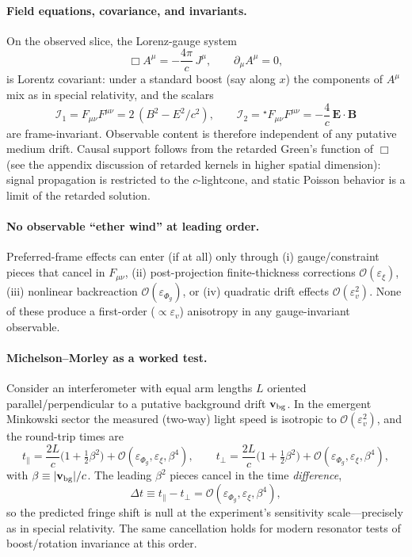 \paragraph{Field equations, covariance, and invariants.}
On the observed slice, the Lorenz-gauge system
\begin{equation}
\Box A^\mu = -\frac{4\pi}{c}\,J^\mu,\qquad \partial_\mu A^\mu=0,
\end{equation}
is Lorentz covariant: under a standard boost (say along $x$) the components of $A^\mu$ mix as in special relativity, and the scalars
\begin{equation}
\mathcal I_1 = F_{\mu\nu}F^{\mu\nu}=2\,(B^2-E^2/c^2),\qquad
\mathcal I_2 = {}^\star\!F_{\mu\nu}F^{\mu\nu}=-\frac{4}{c}\,\mathbf E\cdot\mathbf B
\end{equation}
are frame-invariant. Observable content is therefore independent of any putative medium drift. Causal support follows from the retarded Green's function of $\Box$ (see the appendix discussion of retarded kernels in higher spatial dimension): signal propagation is restricted to the $c$-lightcone, and static Poisson behavior is a limit of the retarded solution.

\paragraph{No observable ``ether wind'' at leading order.}
Preferred-frame effects can enter (if at all) only through (i) gauge/constraint pieces that cancel in $F_{\mu\nu}$, (ii) post-projection finite-thickness corrections $\mathcal O(\varepsilon_\xi)$, (iii) nonlinear backreaction $\mathcal O(\varepsilon_{\Phi_g})$, or (iv) quadratic drift effects $\mathcal O(\varepsilon_v^2)$. None of these produce a first-order ($\propto \varepsilon_v$) anisotropy in any gauge-invariant observable.

\paragraph{Michelson–Morley as a worked test.}
Consider an interferometer with equal arm lengths $L$ oriented parallel/perpendicular to a putative background drift $\mathbf v_{\rm bg}$. In the emergent Minkowski sector the measured (two-way) light speed is isotropic to $\mathcal O(\varepsilon_v^2)$, and the round-trip times are
\begin{equation}
t_{\parallel}=\frac{2L}{c}\Big(1+\tfrac{1}{2}\beta^2\Big)+\mathcal O(\varepsilon_{\Phi_g},\varepsilon_\xi,\beta^4),\qquad
t_{\perp}=\frac{2L}{c}\Big(1+\tfrac{1}{2}\beta^2\Big)+\mathcal O(\varepsilon_{\Phi_g},\varepsilon_\xi,\beta^4),
\end{equation}
with $\beta\equiv|\mathbf v_{\rm bg}|/c$. The leading $\beta^2$ pieces cancel in the time \emph{difference},
\begin{equation}
\Delta t \equiv t_{\parallel}-t_{\perp}=\mathcal O(\varepsilon_{\Phi_g},\varepsilon_\xi,\beta^4),
\end{equation}
so the predicted fringe shift is null at the experiment's sensitivity scale—precisely as in special relativity. The same cancellation holds for modern resonator tests of boost/rotation invariance at this order.

